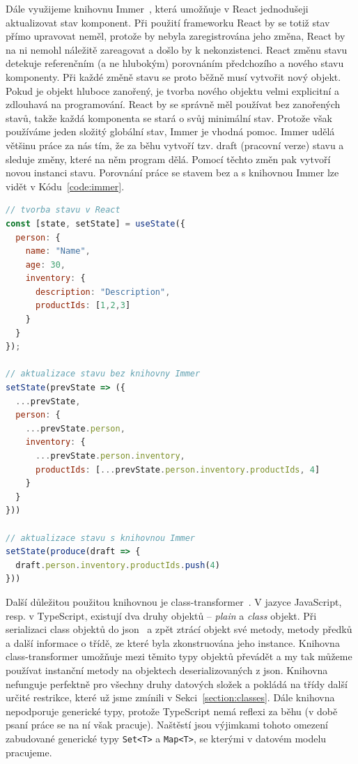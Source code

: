 Dále využijeme knihovnu Immer~\cite{michelweststrate_immer_2017}, která umožňuje v React jednodušeji aktualizovat stav komponent.
Při použití frameworku React by se totiž stav přímo upravovat neměl, protože by nebyla zaregistrována jeho změna, React by na ni nemohl náležitě zareagovat a došlo by k nekonzistenci.
React změnu stavu detekuje referenčním (a ne hlubokým) porovnáním předchozího a nového stavu komponenty.
Při každé změně stavu se proto běžně musí vytvořit nový objekt.
Pokud je objekt hluboce zanořený, je tvorba nového objektu velmi explicitní a zdlouhavá na programování.
React by se správně měl používat bez zanořených stavů, takže každá komponenta se stará o svůj minimální stav.
Protože však používáme jeden složitý globální stav, Immer je vhodná pomoc.
Immer udělá většinu práce za nás tím, že za běhu vytvoří tzv. draft (pracovní verze) stavu a sleduje změny, které na něm program dělá.
Pomocí těchto změn pak vytvoří novou instanci stavu.
Porovnání práce se stavem bez a s knihovnou Immer lze vidět v Kódu~\ref{code:immer}.

\begin{lstlisting}[language=JavaScript,float=htb,caption=Použití knihovny Immer,label=code:immer]
// tvorba stavu v React
const [state, setState] = useState({
  person: {
    name: "Name",
    age: 30,
    inventory: {
      description: "Description",
      productIds: [1,2,3]
    }
  }
});

// aktualizace stavu bez knihovny Immer
setState(prevState => ({
  ...prevState,
  person: {
    ...prevState.person,
    inventory: {
      ...prevState.person.inventory,
      productIds: [...prevState.person.inventory.productIds, 4]
    }
  }
}))

// aktualizace stavu s knihovnou Immer
setState(produce(draft => {
  draft.person.inventory.productIds.push(4)
}))
\end{lstlisting}

Další důležitou použitou knihovnou je class-transformer~\cite{attilaolah_classtransformer_2016}.
V jazyce JavaScript, resp. v TypeScript, existují dva druhy objektů -- \emph{plain} a \emph{class} objekt.
Při serializaci class objektů do \acrshort{json}~\cite{tc39group_jsondata_2017} a zpět ztrácí objekt své metody, metody předků a další informace o třídě, ze které byla zkonstruována jeho instance.
Knihovna class-transformer umožňuje mezi těmito typy objektů převádět a my tak můžeme používat instanční metody na objektech deserializovaných z \acrshort{json}.
Knihovna nefunguje perfektně pro všechny druhy datových složek a pokládá na třídy další určité restrikce, které už jsme zmínili v Sekci~\ref{section:classes}.
Dále knihovna nepodporuje generické typy, protože TypeScript nemá reflexi za běhu (v době psaní práce se na ní však pracuje).
Naštěstí jsou výjimkami tohoto omezení zabudované generické typy \texttt{Set<T>} a \texttt{Map<T>}, se kterými v datovém modelu pracujeme.

